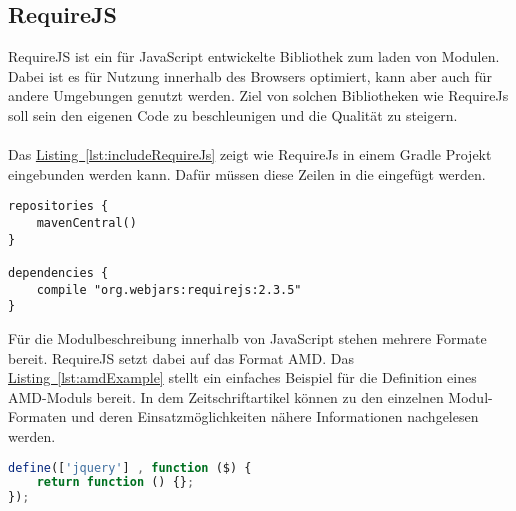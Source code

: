 \subsection{RequireJS}\label{sec:requireJs}
RequireJS \cite{requirejs} ist ein für JavaScript entwickelte Bibliothek zum laden von Modulen. Dabei ist es für Nutzung innerhalb des Browsers optimiert, kann aber auch für andere Umgebungen genutzt werden. Ziel von solchen Bibliotheken wie RequireJs soll sein den eigenen Code zu beschleunigen und die Qualität zu steigern.\\
\\
Das \hyperref[lst:includeRequireJs]{Listing~\ref{lst:includeRequireJs}} zeigt wie RequireJs in einem Gradle Projekt eingebunden werden kann. Dafür müssen diese Zeilen in die  eingefügt werden.
\begin{lstlisting}[style=lstStyleFramed, language=Gradle, caption={Einbindung der Bibliothek RequireJs mithilfe von Gradle}, label=lst:includeRequireJs, float]
repositories {
	mavenCentral()
}

dependencies {
	compile "org.webjars:requirejs:2.3.5"
}
\end{lstlisting}
Für die Modulbeschreibung innerhalb von JavaScript stehen mehrere Formate bereit. RequireJS setzt dabei auf das Format \gls{AMD}. Das \hyperref[lst:amdExample]{Listing~\ref{lst:amdExample}} stellt ein einfaches Beispiel für die Definition eines \gls{AMD}-Moduls bereit. In dem Zeitschriftartikel \cite{jsModuleDefinitions} können zu den einzelnen Modul-Formaten und deren Einsatzmöglichkeiten nähere Informationen nachgelesen werden.
\begin{lstlisting}[style=lstStyleFramed, language=JavaScript, caption={Beispiel: Moduldefinition mittels \acrfull{AMD} \cite{requirejsExample}}, label=lst:amdExample, float]
define(['jquery'] , function ($) {
	return function () {};
});
\end{lstlisting}


